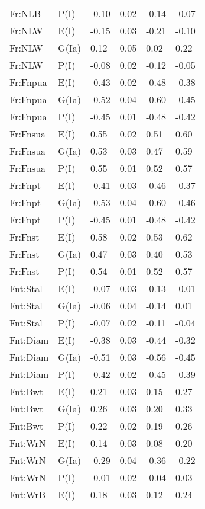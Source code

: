 \begin{center}
\begin{longtable}{|p{1.1in}|p{0.7in}|p{0.7in}|p{0.6in}|p{0.6in}|p{0.6in}|}
  Fr:NLB & P(I) & -0.10 & 0.02 & -0.14 & -0.07 \\ 
  Fr:NLW & E(I) & -0.15 & 0.03 & -0.21 & -0.10 \\ 
  Fr:NLW & G(Ia) & 0.12 & 0.05 & 0.02 & 0.22 \\ 
  Fr:NLW & P(I) & -0.08 & 0.02 & -0.12 & -0.05 \\ 
  Fr:Fnpua & E(I) & -0.43 & 0.02 & -0.48 & -0.38 \\ 
  Fr:Fnpua & G(Ia) & -0.52 & 0.04 & -0.60 & -0.45 \\ 
  Fr:Fnpua & P(I) & -0.45 & 0.01 & -0.48 & -0.42 \\ 
  Fr:Fnsua & E(I) & 0.55 & 0.02 & 0.51 & 0.60 \\ 
  Fr:Fnsua & G(Ia) & 0.53 & 0.03 & 0.47 & 0.59 \\ 
  Fr:Fnsua & P(I) & 0.55 & 0.01 & 0.52 & 0.57 \\ 
  Fr:Fnpt & E(I) & -0.41 & 0.03 & -0.46 & -0.37 \\ 
  Fr:Fnpt & G(Ia) & -0.53 & 0.04 & -0.60 & -0.46 \\ 
  Fr:Fnpt & P(I) & -0.45 & 0.01 & -0.48 & -0.42 \\ 
  Fr:Fnst & E(I) & 0.58 & 0.02 & 0.53 & 0.62 \\ 
  Fr:Fnst & G(Ia) & 0.47 & 0.03 & 0.40 & 0.53 \\ 
  Fr:Fnst & P(I) & 0.54 & 0.01 & 0.52 & 0.57 \\ 
  Fnt:Stal & E(I) & -0.07 & 0.03 & -0.13 & -0.01 \\ 
  Fnt:Stal & G(Ia) & -0.06 & 0.04 & -0.14 & 0.01 \\ 
  Fnt:Stal & P(I) & -0.07 & 0.02 & -0.11 & -0.04 \\ 
  Fnt:Diam & E(I) & -0.38 & 0.03 & -0.44 & -0.32 \\ 
  Fnt:Diam & G(Ia) & -0.51 & 0.03 & -0.56 & -0.45 \\ 
  Fnt:Diam & P(I) & -0.42 & 0.02 & -0.45 & -0.39 \\ 
  Fnt:Bwt & E(I) & 0.21 & 0.03 & 0.15 & 0.27 \\ 
  Fnt:Bwt & G(Ia) & 0.26 & 0.03 & 0.20 & 0.33 \\ 
  Fnt:Bwt & P(I) & 0.22 & 0.02 & 0.19 & 0.26 \\ 
  Fnt:WrN & E(I) & 0.14 & 0.03 & 0.08 & 0.20 \\ 
  Fnt:WrN & G(Ia) & -0.29 & 0.04 & -0.36 & -0.22 \\ 
  Fnt:WrN & P(I) & -0.01 & 0.02 & -0.04 & 0.03 \\ 
  Fnt:WrB & E(I) & 0.18 & 0.03 & 0.12 & 0.24 \\ 

\end{longtable}
\end{center}
